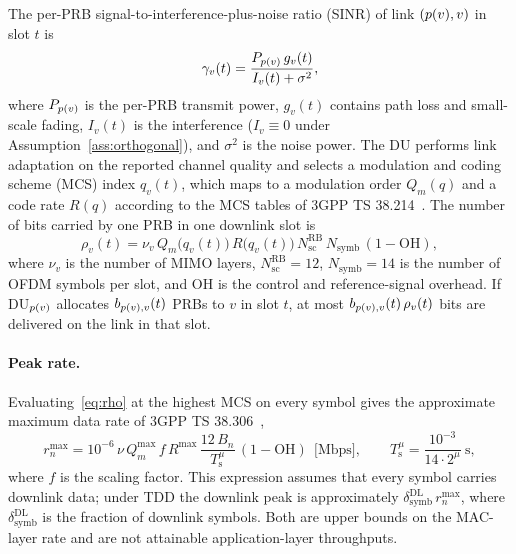 \begin{EnChapter}
The per-PRB signal-to-interference-plus-noise ratio (SINR) of link
$(p(v), v)$ in slot $t$ is
\begin{equation}
  \gamma_v(t) = \frac{P_{p(v)}\, g_v(t)}{I_v(t) + \sigma^2},
  \label{eq:sinr}
\end{equation}
where $P_{p(v)}$ is the per-PRB transmit power, $g_v(t)$ contains path loss
and small-scale fading, $I_v(t)$ is the interference ($I_v \equiv 0$ under
Assumption~\ref{ass:orthogonal}), and $\sigma^2$ is the noise power. The DU performs
link adaptation on the reported channel quality and selects a modulation and coding
scheme (MCS) index $q_v(t)$, which maps to a modulation order $Q_m(q)$ and a code
rate $R(q)$ according to the MCS tables of 3GPP TS 38.214~\cite{3gpp38214}. The number of bits
carried by one PRB in one downlink slot is
\begin{equation}
  \rho_v(t) = \nu_v\, Q_m\bigl(q_v(t)\bigr)\, R\bigl(q_v(t)\bigr)\, N_{\mathrm{sc}}^{\mathrm{RB}}\, N_{\mathrm{symb}}\, (1 - \mathrm{OH}),
  \label{eq:rho}
\end{equation}
where $\nu_v$ is the number of MIMO layers, $N_{\mathrm{sc}}^{\mathrm{RB}}=12$,
$N_{\mathrm{symb}}=14$ is the number of OFDM symbols per slot, and $\mathrm{OH}$ is
the control and reference-signal overhead. If DU$_{p(v)}$ allocates
$b_{p(v),v}(t)$ PRBs to $v$ in slot $t$, at most $b_{p(v),v}(t)\,\rho_v(t)$
bits are delivered on the link in that slot.

\paragraph{Peak rate.}
Evaluating~\eqref{eq:rho} at the highest MCS on every symbol gives the approximate
maximum data rate of 3GPP TS 38.306~\cite{3gpp38306},
\begin{equation}
  r^{\max}_n = 10^{-6}\, \nu\, Q_m^{\max}\, f\, R^{\max}\, \frac{12\, B_n}{T_{\mathrm{s}}^{\mu}}\, (1 - \mathrm{OH})
  \ \ \text{[Mbps]}, \qquad
  T_{\mathrm{s}}^{\mu} = \frac{10^{-3}}{14 \cdot 2^{\mu}}\ \text{s},
  \label{eq:peak}
\end{equation}
where $f$ is the scaling factor. This expression assumes that every symbol carries
downlink data; under TDD the downlink peak is approximately
$\delta^{\mathrm{DL}}_{\mathrm{symb}}\, r^{\max}_n$, where
$\delta^{\mathrm{DL}}_{\mathrm{symb}}$ is the fraction of downlink symbols. Both are
upper bounds on the MAC-layer rate and are not attainable application-layer
throughputs.


\end{EnChapter}
